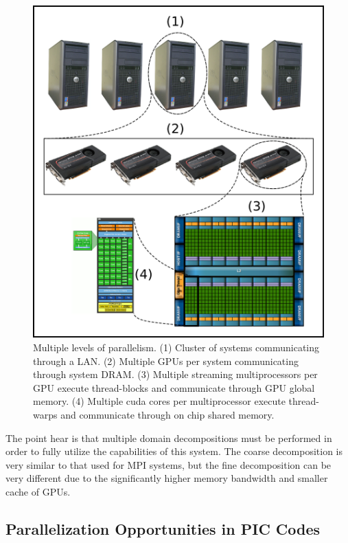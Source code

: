 \begin{figure}
\begin{center}
\includegraphics[width=5in]{introduction/multi_parallel.png}
\end{center}
\caption{Multiple levels of parallelism. (1) Cluster of systems communicating through a LAN. (2) Multiple GPUs per system communicating through system DRAM. (3) Multiple streaming multiprocessors per GPU execute thread-blocks and communicate through GPU global memory. (4) Multiple cuda cores per multiprocessor execute thread-warps and communicate through on chip shared memory. }
\label{fig:multiparallel}
\end{figure}

The point hear is that multiple domain decompositions must be performed in order to fully utilize the capabilities of this system. The coarse decomposition is very similar to that used for MPI systems, but the fine decomposition can be very different due to the significantly higher memory bandwidth and smaller cache of GPUs. 

		\subsection{Parallelization Opportunities in PIC Codes}

